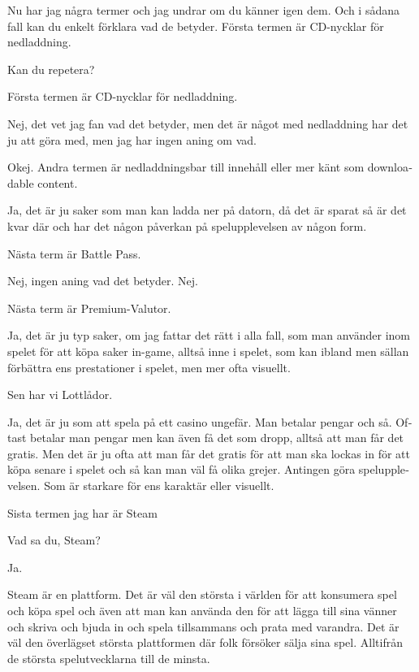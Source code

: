 \documentclass[11p]{article}
\begin{document}
\begin{otherlanguage}{swedish}
    \setlength{\leftskip}{0cm}
    Nu har jag några termer och jag undrar om du känner igen dem. Och i sådana fall kan du enkelt förklara vad de betyder.
    Första termen är CD-nycklar för nedladdning.


    \setlength{\leftskip}{1cm}
    Kan du repetera?


    \setlength{\leftskip}{0cm}
    Första termen är CD-nycklar för nedladdning.


    \setlength{\leftskip}{1cm}
    Nej, det vet jag fan vad det betyder, men det är något med nedladdning har det ju att göra med,  men jag har ingen aning om vad.


    \setlength{\leftskip}{0cm}
    Okej.
    Andra termen är nedladdningsbar till innehåll eller mer känt som downloadable content.


    \setlength{\leftskip}{1cm}
    Ja, det är ju saker som man kan ladda ner på datorn,  då det är sparat så är det kvar där och har det någon påverkan på spelupplevelsen av någon form.


    \setlength{\leftskip}{0cm}
    Nästa term är Battle Pass.


    \setlength{\leftskip}{1cm}
    Nej, ingen aning vad det betyder. Nej.


    \setlength{\leftskip}{0cm}
    Nästa term är Premium-Valutor.


    \setlength{\leftskip}{1cm}
    Ja, det är ju typ saker, om jag fattar det rätt i alla fall, som man använder inom spelet för att köpa saker in-game, alltså inne i spelet, som kan ibland men sällan förbättra ens prestationer i spelet, men mer ofta visuellt.


    \setlength{\leftskip}{0cm}
    Sen har vi Lottlådor.


    \setlength{\leftskip}{1cm}
    Ja, det är ju som att spela på ett casino ungefär. Man betalar pengar och så.
    Oftast betalar man pengar men kan även få det som dropp, alltså att man får det gratis. Men det är ju ofta att man får det gratis  för att man ska lockas in för att köpa senare i spelet och så kan man väl få olika grejer.
    Antingen göra spelupplevelsen. Som är starkare för ens karaktär eller visuellt.


    \setlength{\leftskip}{0cm}
    Sista termen jag har är Steam


    \setlength{\leftskip}{1cm}
    Vad sa du, Steam?


    \setlength{\leftskip}{0cm}
    Ja.


    \setlength{\leftskip}{1cm}
    Steam är en plattform. Det är väl den största i världen för att konsumera spel och köpa spel och även att man kan använda den för att lägga till sina vänner och skriva och bjuda in och spela tillsammans och prata med varandra.
    Det är väl den överlägset största plattformen där folk försöker sälja sina spel. Alltifrån de största spelutvecklarna till de minsta.




\end{otherlanguage}
\end{document}

